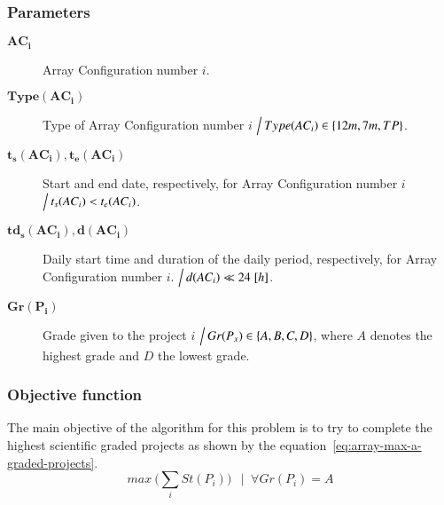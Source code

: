 \subsubsection{Parameters}
\begin{description}
\item[$\mathbf{AC_i}$] Array Configuration number $i$.

\item[$\mathbf{Type(AC_i)}$] Type of Array Configuration number $i$ $\Big\slash\: Type(AC_i) \in \{12m, 7m, TP\}$.

\item[$\mathbf{t_s(AC_i), t_e(AC_i)}$] Start and end date, respectively, for Array Configuration number $i$ $\Big\slash\: t_s(AC_i) < t_e(AC_i)$.

\item[$\mathbf{td_s(AC_i), d(AC_i)}$] Daily start time and duration of the daily period, respectively, for Array Configuration number $i$. $\Big\slash\: d(AC_i) \ll 24\;[h]$.

\item[$\mathbf{Gr(P_i)}$] Grade given to the project $i$ $\Big\slash\: Gr(P_x) \in \{A,B,C,D\}$, where $A$ denotes the highest grade and $D$ the lowest grade.
\end{description}

\subsubsection{Objective function}
The main objective of the algorithm for this problem is to try to complete the highest scientific graded projects as shown by the equation~\ref{eq:array-max-a-graded-projects}.
\begin{equation}
\label{eq:array-max-a-graded-projects}
max \: \bigg(\sum_{i} St(P_i)\bigg) \:\: \mid\; \forall Gr(P_i) = A
\end{equation}

